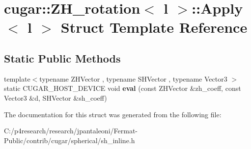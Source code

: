 \hypertarget{structcugar_1_1_z_h__rotation_1_1_apply_3_01l_01_4}{}\section{cugar\+:\+:Z\+H\+\_\+rotation$<$ l $>$\+:\+:Apply$<$ l $>$ Struct Template Reference}
\label{structcugar_1_1_z_h__rotation_1_1_apply_3_01l_01_4}
\subsection*{Static Public Methods}
\begin{DoxyCompactItemize}
\item 
\mbox{\label{structcugar_1_1_z_h__rotation_1_1_apply_3_01l_01_4_aa6244de48f7d8303c6103209e945bcfd}} 
{\footnotesize template$<$typename Z\+H\+Vector , typename S\+H\+Vector , typename Vector3 $>$ }\\static C\+U\+G\+A\+R\+\_\+\+H\+O\+S\+T\+\_\+\+D\+E\+V\+I\+CE void {\bfseries eval} (const Z\+H\+Vector \&zh\+\_\+coeff, const Vector3 \&d, S\+H\+Vector \&sh\+\_\+coeff)
\end{DoxyCompactItemize}


The documentation for this struct was generated from the following file\+:\begin{DoxyCompactItemize}
\item 
C\+:/p4research/research/jpantaleoni/\+Fermat-\/\+Public/contrib/cugar/spherical/sh\+\_\+inline.\+h\end{DoxyCompactItemize}
